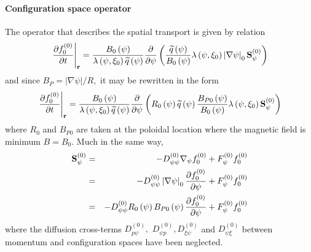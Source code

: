 

\paragraph{Configuration space operator}

The operator that describes the spatial transport is given by relation
\begin{equation}
\left. \frac{\partial f_{0}^{\left( 0\right) }}{\partial t}\right| _{\mathbf{%
r}}=\frac{B_{0}\left( \psi \right) }{\lambda \left( \psi ,\xi _{0}\right)
\widetilde{q}\left( \psi \right) }\frac{\partial }{\partial \psi }\left(
\frac{\widetilde{q}\left( \psi \right) }{B_{0}\left( \psi \right) }\lambda
\left( \psi ,\xi _{0}\right) \left| \nabla \psi \right| _{0}\mathbf{S}_{\psi
}^{\left( 0\right) }\right)  \label{eq1}
\end{equation}
and since $B_{P}=\left| \nabla \psi \right| /R,$ it may be rewritten in the
form
\begin{equation}
\left. \frac{\partial f_{0}^{\left( 0\right) }}{\partial t}\right| _{\mathbf{%
r}}=\frac{B_{0}\left( \psi \right) }{\lambda \left( \psi ,\xi _{0}\right)
\widetilde{q}\left( \psi \right) }\frac{\partial }{\partial \psi }\left(
R_{0}\left( \psi \right) \widetilde{q}\left( \psi \right) \frac{B_{P0}\left(
\psi \right) }{B_{0}\left( \psi \right) }\lambda \left( \psi ,\xi
_{0}\right) \mathbf{S}_{\psi }^{\left( 0\right) }\right)
\end{equation}
where $R_{0}$ and $B_{P0}$ are taken at the poloidal location where the
magnetic field is minimum $B=B_{0}$. Much in the same way,
\begin{eqnarray}
\mathbf{S}_{\psi }^{\left( 0\right) } &=&-D_{\psi \psi }^{\left( 0\right)
}\nabla _{\psi }f_{0}^{\left( 0\right) }+F_{\psi }^{\left( 0\right)
}f_{0}^{\left( 0\right) }  \nonumber \\
&=&-D_{\psi \psi }^{\left( 0\right) }\left| \nabla \psi \right| _{0}\frac{%
\partial f_{0}^{\left( 0\right) }}{\partial \psi }+F_{\psi }^{\left(
0\right) }f_{0}^{\left( 0\right) }  \nonumber \\
&=&-D_{\psi \psi }^{\left( 0\right) }R_{0}\left( \psi \right) B_{P0}\left(
\psi \right) \frac{\partial f_{0}^{\left( 0\right) }}{\partial \psi }
+F_{\psi }^{\left( 0\right) }f_{0}^{\left( 0\right) }  \label{eq2}
\end{eqnarray}
where the diffusion cross-terms $D_{p\psi }^{\left( 0\right) },$ $D_{\psi
p}^{\left( 0\right) },D_{\xi \psi }^{\left( 0\right) }$ and $D_{\psi \xi
}^{\left( 0\right) }$ between momentum and configuration spaces have been
neglected.

